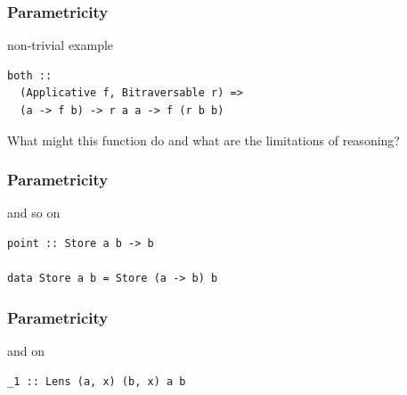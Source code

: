 \begin{frame}[fragile]
\frametitle{Parametricity}
\begin{block}{non-trivial example}
\begin{lstlisting}[style=haskell]
both ::
  (Applicative f, Bitraversable r) =>
  (a -> f b) -> r a a -> f (r b b)
\end{lstlisting}
\end{block}
\begin{center}
What might this function do and what are the limitations of reasoning?
\end{center}
\end{frame}

\begin{frame}[fragile]
\frametitle{Parametricity}
\begin{block}{and so on}
\begin{lstlisting}[style=haskell]
point :: Store a b -> b

data Store a b = Store (a -> b) b
\end{lstlisting}
\end{block}
\end{frame}

\begin{frame}[fragile]
\frametitle{Parametricity}
\begin{block}{and on}
\begin{lstlisting}[style=haskell]
_1 :: Lens (a, x) (b, x) a b
\end{lstlisting}
\end{block}
\end{frame}
